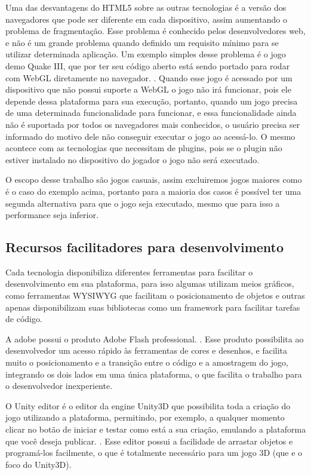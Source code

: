 Uma das desvantagens do HTML5 sobre as outras tecnologias é a versão
dos navegadores que pode ser diferente em cada dispositivo, assim
aumentando o problema de fragmentação. Esse problema é conhecido pelos
desenvolvedores web, e não é um grande problema quando definido um
requisito mínimo para se utilizar determinada aplicação. Um exemplo
simples desse problema é o jogo demo Quake III, que por ter seu código
aberto está sendo portado para rodar com WebGL diretamente no navegador.
\cite{website:webglquake3}. Quando esse jogo é acessado por um
dispositivo que não possui suporte a WebGL o jogo não irá funcionar,
pois ele depende dessa plataforma para sua execução, portanto, quando
um jogo precisa de uma determinada funcionalidade para funcionar, e
essa funcionalidade ainda não é suportada por todos os navegadores
mais conhecidos, o usuário precisa ser informado do motivo dele não
conseguir executar o jogo ao acessá-lo. O mesmo acontece com as
tecnologias que necessitam de plugins, pois se o plugin não estiver
instalado no dispositivo do jogador o jogo não será executado.

O escopo desse trabalho são jogos casuais, assim excluiremos jogos
maiores como é o caso do exemplo acima, portanto para a maioria dos
casos é possível ter uma segunda alternativa para que o jogo seja
executado, mesmo que para isso a performance seja inferior.

\subsection{Recursos facilitadores para desenvolvimento}

Cada tecnologia disponibiliza diferentes ferramentas para facilitar o
desenvolvimento em sua plataforma, para isso algumas utilizam meios
gráficos, como ferramentas WYSIWYG que facilitam o posicionamento de
objetos e outras apenas disponibilizam suas bibliotecas como um
framework para facilitar tarefas de código.

A adobe possui o produto Adobe Flash professional. \cite{website:adobeflash}.
Esse produto possibilita ao desenvolvedor um acesso rápido às ferramentas de cores
e desenhos, e facilita muito o posicionamento e a transição entre o
código e a amostragem do jogo, integrando os dois lados em uma única
plataforma, o que facilita o trabalho para o desenvolvedor
inexperiente.

O Unity editor é o editor da engine Unity3D que possibilita toda a
criação do jogo utilizando a plataforma, permitindo, por exemplo, a
qualquer momento clicar no botão de iniciar e testar como está a sua
criação, emulando a plataforma que você deseja publicar. \cite{website:unity3d}.
Esse editor possui a facilidade de arrastar objetos e programá-los
facilmente, o que é totalmente necessário para um jogo 3D (que e o
foco do Unity3D).

